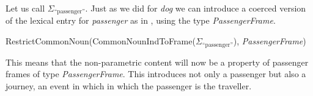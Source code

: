    
Let us call \preveg{} $\Sigma_{\text{``passenger''}}$.  Just as we did
for \textit{dog} we can introduce a coerced version of the lexical
entry for \textit{passenger} as in \nexteg{}, using the type \textit{PassengerFrame}.
\begin{ex} 
RestrictCommonNoun(CommonNounIndToFrame($\Sigma_{\text{``passenger''}}$),
\textit{PassengerFrame})
\label{ex:passengerrestricted}
\end{ex} 
  
 
 
 
This means that the non-parametric content will now be a property of
passenger frames of type \textit{PassengerFrame}.  This introduces not
only a passenger but also a journey, an event in which in which the
passenger is the traveller.

